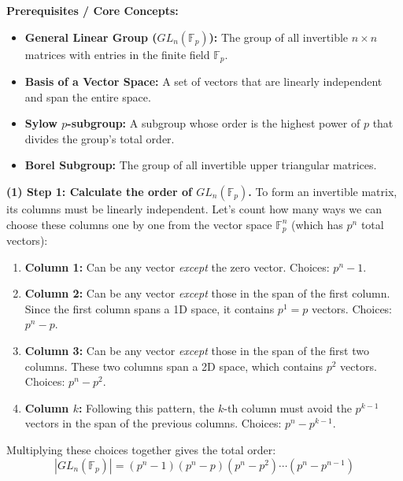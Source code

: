 \begin{solution}
\textbf{Prerequisites / Core Concepts:}
\begin{itemize}
    \item \textbf{General Linear Group ($GL_n(\mathbb{F}_p)$):} The group of all invertible $n \times n$ matrices with entries in the finite field $\mathbb{F}_p$.
    \item \textbf{Basis of a Vector Space:} A set of vectors that are linearly independent and span the entire space.
    \item \textbf{Sylow $p$-subgroup:} A subgroup whose order is the highest power of $p$ that divides the group's total order.
    \item \textbf{Borel Subgroup:} The group of all invertible upper triangular matrices.
\end{itemize}

\textbf{(1) Step 1: Calculate the order of $GL_n(\mathbb{F}_p)$.}
To form an invertible matrix, its columns must be linearly independent. Let's count how many ways we can choose these columns one by one from the vector space $\mathbb{F}_p^n$ (which has $p^n$ total vectors):
\begin{enumerate}
    \item \textbf{Column 1:} Can be any vector \textit{except} the zero vector. Choices: $p^n - 1$.
    \item \textbf{Column 2:} Can be any vector \textit{except} those in the span of the first column. Since the first column spans a 1D space, it contains $p^1 = p$ vectors. Choices: $p^n - p$.
    \item \textbf{Column 3:} Can be any vector \textit{except} those in the span of the first two columns. These two columns span a 2D space, which contains $p^2$ vectors. Choices: $p^n - p^2$.
    \item \textbf{Column $k$:} Following this pattern, the $k$-th column must avoid the $p^{k-1}$ vectors in the span of the previous columns. Choices: $p^n - p^{k-1}$.
\end{enumerate}
Multiplying these choices together gives the total order:
\[ |GL_n(\mathbb{F}_p)| = (p^n - 1)(p^n - p)(p^n - p^2) \cdots (p^n - p^{n-1}) \]


\end{solution}
